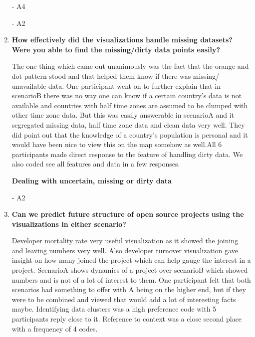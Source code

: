\documentclass[seploa]{beavtex}
\begin{document}
\begin{enumerate}
{\em {}} - A4

{\em {}} - A2

\item \textbf{How effectively did the visualizations handle missing datasets? Were you able to find the missing/dirty data points easily?}

The one thing which came out unanimously was the fact that the orange and dot pattern stood and that helped them know if there was missing/ unavailable data. One participant went on to further explain that in scenarioB there was no way one can know if a certain country's data is not available and countries with half time zones are assumed to be clumped with other time zone data. But this was easily answerable in scenarioA and it segregated missing data, half time zone data and clean data very well. They did point out that the knowledge of a country's population is personal and it would have been nice to view this on the map somehow as well.All 6 participants made direct response to the feature of handling dirty data. We also coded see all features and data in a few responses.

\textbf{Dealing with uncertain, missing or dirty data}

{\em {}} - A2

\item \textbf{Can we predict future structure of open source projects using the visualizations in either scenario?}

Developer mortality rate very useful visualization as it showed the joining and leaving numbers very well. Also developer turnover visualization gave insight on how many joined the project which can help gauge the interest in a project. ScenarioA shows dynamics of a project over scenarioB which showed numbers and is not of a lot of interest to them. One participant felt that both scenarios had something to offer with A being on the higher end, but if they were to be combined and viewed that would add a lot of interesting facts maybe. Identifying data clusters was a high preference code with 5 participants reply close to it. Reference to context was a close second place with a frequency of 4 codes.


\end{enumerate}
\end{document}
